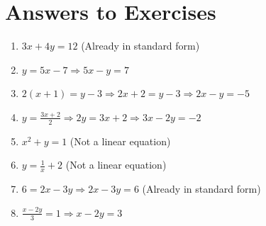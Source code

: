 \documentclass{article}
\begin{document}
\newpage

\section*{Answers to Exercises}
\begin{enumerate}
    \item \(3x + 4y = 12\) (Already in standard form)
    \item \(y = 5x - 7 \Rightarrow 5x - y = 7\)
    \item \(2(x + 1) = y - 3 \Rightarrow 2x + 2 = y - 3 \Rightarrow 2x - y = -5\)
    \item \(y = \frac{3x + 2}{2} \Rightarrow 2y = 3x + 2 \Rightarrow 3x - 2y = -2\)
    \item \(x^2 + y = 1\) (Not a linear equation)
    \item \(y = \frac{1}{x} + 2\) (Not a linear equation)
    \item \(6 = 2x - 3y \Rightarrow 2x - 3y = 6\) (Already in standard form)
    \item \(\frac{x - 2y}{3} = 1 \Rightarrow x - 2y = 3\)
\end{enumerate}
\end{document}
